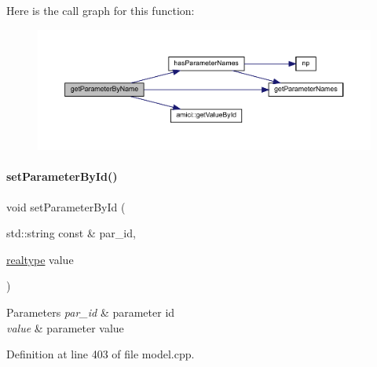 Here is the call graph for this function\+:
\nopagebreak
\begin{figure}[H]
\begin{center}
\leavevmode
\includegraphics[width=350pt]{classamici_1_1_model_a19b349ca9793d45fda7ef8ea7422747a_cgraph}
\end{center}
\end{figure}
\mbox{\label{classamici_1_1_model_a995357a19663980279249d4b89a88f7a}} 
\paragraph{\texorpdfstring{set\+Parameter\+By\+Id()}{setParameterById()}}
{\footnotesize\ttfamily void set\+Parameter\+By\+Id (\begin{DoxyParamCaption}\item[{std\+::string const \&}]{par\+\_\+id,  }\item[{\mbox{\hyperlink{namespaceamici_a1bdce28051d6a53868f7ccbf5f2c14a3}{realtype}}}]{value }\end{DoxyParamCaption})}


\begin{DoxyParams}{Parameters}
{\em par\+\_\+id} & parameter id \\
\hline
{\em value} & parameter value \\
\hline
\end{DoxyParams}


Definition at line 403 of file model.\+cpp.

